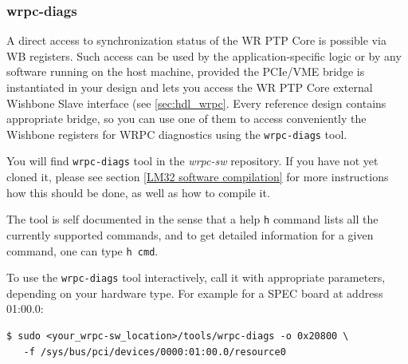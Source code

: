 \documentclass[a4paper, 12pt]{article}
\renewcommand{\_}{\underscore\allowbreak}
\begin{document}
\subsubsection{wrpc-diags}
\label{wrpc-diags}

A direct access to synchronization status of the WR PTP Core is possible via WB registers.
Such access can be used by the application-specific logic or by any software running on the 
host machine, provided the PCIe/VME bridge is instantiated in your design and
lets you access the WR PTP Core external Wishbone Slave interface (see
\ref{sec:hdl_wrpc}. Every reference design contains appropriate bridge, so you
can use one of them to access conveniently the Wishbone registers for WRPC
diagnostics using the \texttt{wrpc-diags} tool.

You will find \texttt{wrpc-diags} tool in the \textit{wrpc-sw} repository. If
you have not yet cloned it, please see section \ref{LM32 software compilation}
for more instructions how this should be done, as well as how to compile it.

The tool is self documented in the sense that a help \texttt{h} command lists
all the currently supported commands, and to get detailed information for a
given command, one can type \texttt{h cmd}.

To use the \texttt{wrpc-diags} tool interactively, call it with appropriate
parameters, depending on your hardware type. For example for a SPEC board at
address 01:00.0:
\begin{lstlisting}
$ sudo <your_wrpc-sw_location>/tools/wrpc-diags -o 0x20800 \
   -f /sys/bus/pci/devices/0000:01:00.0/resource0
\end{lstlisting}
\end{document}
